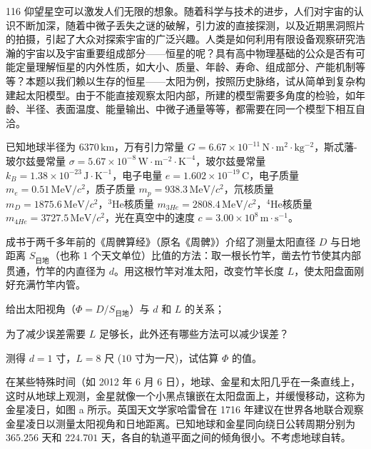 \begin{problem}[第36届全国中学生物理竞赛决赛][构建太阳模型]{116}
    仰望星空可以激发人们无限的想象。随着科学与技术的进步，人们对宇宙的认识不断加深，随着中微子丢失之谜的破解，引力波的直接探测，以及近期黑洞照片的拍摄，引起了大众对探索宇宙的广泛兴趣。人类是如何利用有限设备观察研究浩瀚的宇宙以及宇宙重要组成部分——恒星的呢？具有高中物理基础的公众是否有可能定量理解恒星的内外性质，如大小、质量、年龄、寿命、组成部分、产能机制等等？本题以我们赖以生存的恒星——太阳为例，按照历史脉络，试从简单到复杂构建起太阳模型。由于不能直接观察太阳内部，所建的模型需要多角度的检验，如年龄、半径、表面温度、能量输出、中微子通量等等，都需要在同一个模型下相互自洽。

    已知地球半径为 $6370 \,\mathrm{km}$，万有引力常量 $G=6.67\times10^{-11} \,\mathrm{N\cdot m^{2}\cdot kg^{-2}}$，斯忒藩-玻尔兹曼常量 $\sigma=5.67\times10^{-8} \,\mathrm{W\cdot m^{-2}\cdot K^{-4}}$，玻尔兹曼常量 $k_{B}=1.38\times10^{-23} \,\mathrm{J\cdot K^{-1}}$，电子电量 $e=1.602\times10^{-19} \,\mathrm{C}$，电子质量 $m_{e}=0.51 \,\mathrm{MeV}/c^{2}$，质子质量 $m_{p}=938.3 \,\mathrm{MeV}/c^{2}$，氘核质量 $m_{D}=1875.6 \,\mathrm{MeV}/c^{2}$，$^{3}\mathrm{He}$核质量 $m_{3He}=2808.4 \,\mathrm{MeV}/c^{2}$，$^{4}\mathrm{He}$核质量 $m_{4He}=3727.5 \,\mathrm{MeV}/c^{2}$，光在真空中的速度 $c=3.00\times10^{8} \,\mathrm{m\cdot s^{-1}}$。
    \begin{subproblem}
        成书于两千多年前的《周髀算经》（原名《周髀》）介绍了测量太阳直径 $D$ 与日地距离 $S_{\text{日地}}$（也称 1 个天文单位）比值的方法：取一根长竹竿，凿去竹节使其内部贯通，竹竿的内直径为 $d$。用这根竹竿对准太阳，改变竹竿长度 $L$，使太阳盘面刚好充满竹竿内管。
        \begin{subsubproblem}
            给出太阳视角（$\Phi=D/S_{\text{日地}}$）与 $d$ 和 $L$ 的关系；
        \end{subsubproblem}
        \begin{subsubproblem}
            为了减少误差需要 $L$ 足够长，此外还有哪些方法可以减少误差？
        \end{subsubproblem}
        \begin{subsubproblem}
            测得 $d=1$ 寸，$L=8$ 尺 ($10$ 寸为一尺)，试估算 $\Phi$ 的值。
        \end{subsubproblem}
    \end{subproblem}
    \begin{subproblem}
        在某些特殊时间（如 2012 年 6 月 6 日），地球、金星和太阳几乎在一条直线上，这时从地球上观测，金星就像一个小黑点镶嵌在太阳盘面上，并缓慢移动，这称为金星凌日，如图 a 所示。英国天文学家哈雷曾在 1716 年建议在世界各地联合观察金星凌日以测量太阳视角和日地距离。已知地球和金星同向绕日公转周期分别为 $365.256$ 天和 $224.701$ 天，各自的轨道平面之间的倾角很小。不考虑地球自转。

\end{subproblem}
\end{problem}
